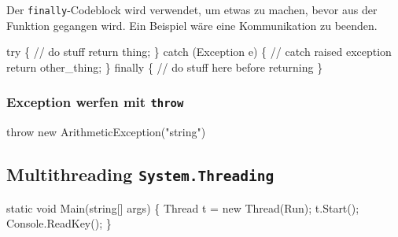 \documentclass[
  9pt,
  a4paperpaper,
  DIV=11]{scrartcl}
\newenvironment{Shaded}{}{}
\newcommand{\CommentTok}[1]{\textcolor[rgb]{0.42,0.45,0.49}{#1}}
\newcommand{\DataTypeTok}[1]{\textcolor[rgb]{0.84,0.23,0.29}{#1}}
\newcommand{\FunctionTok}[1]{\textcolor[rgb]{0.44,0.26,0.76}{#1}}
\newcommand{\KeywordTok}[1]{\textcolor[rgb]{0.84,0.23,0.29}{#1}}
\newcommand{\NormalTok}[1]{\textcolor[rgb]{0.14,0.16,0.18}{#1}}
\newcommand{\OperatorTok}[1]{\textcolor[rgb]{0.14,0.16,0.18}{#1}}
\newcommand{\StringTok}[1]{\textcolor[rgb]{0.01,0.18,0.38}{#1}}
\numberwithin{equation}{section}
\begin{document}
\begin{multicols}{2}
Der \texttt{finally}-Codeblock wird verwendet, um etwas zu machen, bevor
aus der Funktion gegangen wird. Ein Beispiel wäre eine Kommunikation zu
beenden.

\begin{Shaded}
\begin{Highlighting}[]
\KeywordTok{try} \OperatorTok{\{}
  \CommentTok{// do stuff}
  \KeywordTok{return}\NormalTok{ thing}\OperatorTok{;}
\OperatorTok{\}}
\KeywordTok{catch} \OperatorTok{(}\NormalTok{Exception e}\OperatorTok{)} \OperatorTok{\{}
  \CommentTok{// catch raised exception}
  \KeywordTok{return}\NormalTok{ other\_thing}\OperatorTok{;}
\OperatorTok{\}}
\KeywordTok{finally} \OperatorTok{\{}
  \CommentTok{// do stuff here before returning}
\OperatorTok{\}}
\end{Highlighting}
\end{Shaded}

\hypertarget{exception-werfen-mit-throw}{%
\subsubsection{\texorpdfstring{Exception werfen mit
\texttt{throw}}{Exception werfen mit throw}}\label{exception-werfen-mit-throw}}

\begin{Shaded}
\begin{Highlighting}[]
\KeywordTok{throw} \KeywordTok{new} \FunctionTok{ArithmeticException}\OperatorTok{(}\StringTok{"string"}\OperatorTok{)}
\end{Highlighting}
\end{Shaded}

\hypertarget{multithreading-system.threading}{%
\subsection{\texorpdfstring{Multithreading
\texttt{System.Threading}}{Multithreading System.Threading}}\label{multithreading-system.threading}}

\begin{Shaded}
\begin{Highlighting}[]
\KeywordTok{static} \DataTypeTok{void} \FunctionTok{Main}\OperatorTok{(}\DataTypeTok{string}\OperatorTok{[]}\NormalTok{ args}\OperatorTok{)} \OperatorTok{\{}
\NormalTok{  Thread t }\OperatorTok{=} \KeywordTok{new} \FunctionTok{Thread}\OperatorTok{(}\NormalTok{Run}\OperatorTok{);}
\NormalTok{  t}\OperatorTok{.}\FunctionTok{Start}\OperatorTok{();}
\NormalTok{  Console}\OperatorTok{.}\FunctionTok{ReadKey}\OperatorTok{();}
\OperatorTok{\}}


\end{Highlighting}
\end{Shaded}
\end{multicols}
\end{document}
